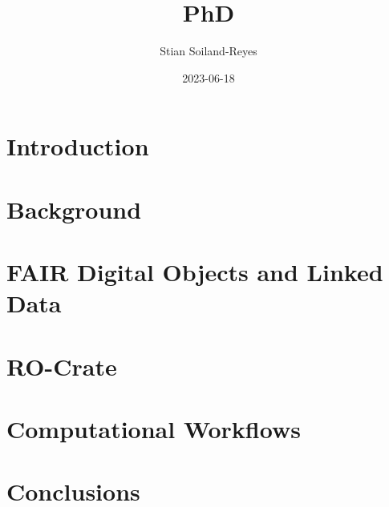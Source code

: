 \documentclass[british,a4paper]{book}
\title{PhD}
\author{Stian Soiland-Reyes}
\date{2023-06-18}
\begin{document}
\frontmatter
\maketitle



\tableofcontents
{}

\listoffigures
{}

\listoftables
{}

\listoflistings
{}


\mainmatter
\fancyhead[LO]{\leftmark}


\chapter{Introduction}
\label{chapter:introduction}


\chapter{Background}
\label{chapter:background}


\chapter{FAIR Digital Objects and Linked Data}
\label{chapter:fdo}



\chapter{RO-Crate}
\label{chapter:ro-crate}




\chapter{Computational Workflows}
\label{chapter:workflows}




\chapter{Conclusions}
\label{chapter:conclusions}



\appendix
{}
\end{document}
